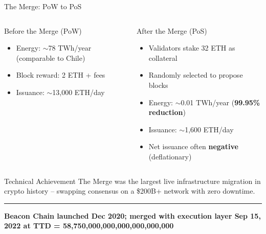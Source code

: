 \documentclass[8pt,aspectratio=169]{beamer}
\newcommand{\bottomnote}[1]{\vfill\vspace{-2mm}\textcolor{mllavender2}{\rule{\textwidth}{0.4pt}}\vspace{1mm}\footnotesize\textbf{#1}}
\begin{document}
\begin{frame}{The Merge: PoW to PoS}
\begin{columns}
\begin{block}{Before the Merge (PoW)}
\begin{itemize}
  \item Energy: $\sim$78 TWh/year (comparable to Chile)
  \item Block reward: 2 ETH + fees
  \item Issuance: $\sim$13,000 ETH/day
\end{itemize}
\end{block}
\begin{block}{After the Merge (PoS)}
\begin{itemize}\small
  \item Validators stake 32 ETH as collateral
  \item Randomly selected to propose blocks
  \item Energy: $\sim$0.01 TWh/year (\textbf{99.95\% reduction})
  \item Issuance: $\sim$1,600 ETH/day
  \item Net issuance often \textbf{negative} (deflationary)
\end{itemize}
\end{block}
\end{columns}
\vspace{1mm}
\begin{alertblock}{Technical Achievement}
\small The Merge was the largest live infrastructure migration in crypto history -- swapping consensus on a \$200B+ network with zero downtime.
\end{alertblock}
\bottomnote{Beacon Chain launched Dec 2020; merged with execution layer Sep 15, 2022 at TTD = 58,750,000,000,000,000,000,000}
\end{frame}
\end{document}
